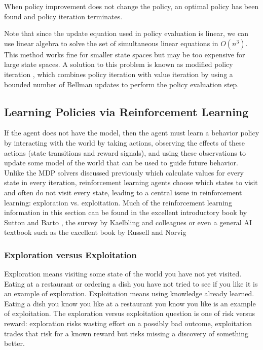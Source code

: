 When policy improvement does not change the policy, an optimal policy has been found and policy iteration terminates.

Note that since the update equation used in policy evaluation is linear, we can use linear algebra to solve the set of simultaneous linear equations in $O(n^3)$. This method works fine for smaller state spaces but may be too expensive for large state spaces. A solution to this problem is known as modified policy iteration \cite{van-nunen1976set,puterman1978modified}, which combines policy iteration with value iteration by using a bounded number of Bellman updates to perform the policy evaluation step.

\subsection{Learning Policies via Reinforcement Learning}\label{sec:rl}

If the agent does not have the model, then the agent must learn a behavior policy by interacting with the world by taking actions, observing the effects of these actions (state transitions and reward signals), and using these observations to update some model of the world that can be used to guide future behavior. Unlike the MDP solvers discussed previously which calculate values for every state in every iteration, reinforcement learning agents choose which states to visit and often do not visit every state, leading to a central issue in reinforcement learning: exploration vs. exploitation. Much of the reinforcement learning information in this section can be found in the excellent introductory book by Sutton and Barto \cite{sutton1998reinforcement}, the survey by Kaelbling and colleagues \cite{kaelbling1996reinforcement} or even a general AI textbook such as the excellent book by Russell and Norvig \cite{russell2003artificial}

\subsubsection{Exploration versus Exploitation}

Exploration means visiting some state of the world you have not yet visited. Eating at a restaurant or ordering a dish you have not tried to see if you like it is an example of exploration. Exploitation means using knowledge already learned. Eating a dish you know you like at a restaurant you know you like is an example of exploitation. The exploration versus exploitation question is one of risk versus reward: exploration risks wasting effort on a possibly bad outcome, exploitation trades that risk for a known reward but risks missing a discovery of something better.

